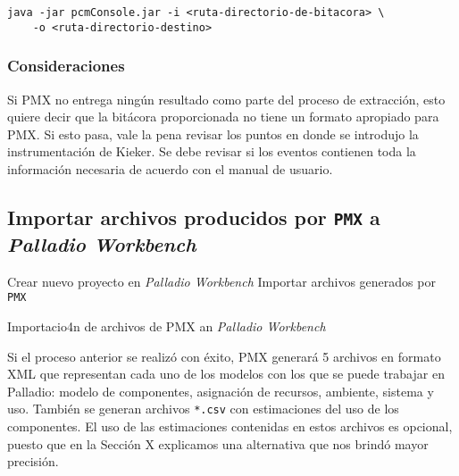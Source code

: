 \begin{verbatim}
java -jar pcmConsole.jar -i <ruta-directorio-de-bitacora> \
    -o <ruta-directorio-destino>
\end{verbatim}

\subsubsection{Consideraciones}
Si PMX no entrega ningún resultado como parte del proceso de extracción, esto quiere decir que la bitácora proporcionada no tiene un formato apropiado para PMX. Si esto pasa, vale la pena revisar los puntos en donde se introdujo la instrumentación de Kieker. Se debe revisar si los eventos contienen toda la información necesaria de acuerdo con el manual de usuario. 

\subsection{Importar archivos producidos por \texttt{PMX} a \emph{Palladio Workbench}}
\begin{singlespace}
\begin{algorithm}[H]
\SetAlgoLined
Crear nuevo proyecto en \emph{Palladio Workbench}\;
Importar archivos generados por \texttt{PMX}\;
\caption{Importacio4n de archivos de PMX an \emph{Palladio Workbench}}
\end{algorithm}
\end{singlespace}

Si el proceso anterior se realizó con éxito, PMX  generará 5 archivos en formato XML que representan cada uno de los modelos con los que se puede trabajar en Palladio: modelo de componentes, asignación de recursos, ambiente, sistema y uso. También se generan archivos \texttt{*.csv} con estimaciones del uso de los componentes. El uso de las estimaciones contenidas en estos archivos es opcional, puesto que en la Sección X explicamos una alternativa que nos brindó mayor precisión.

